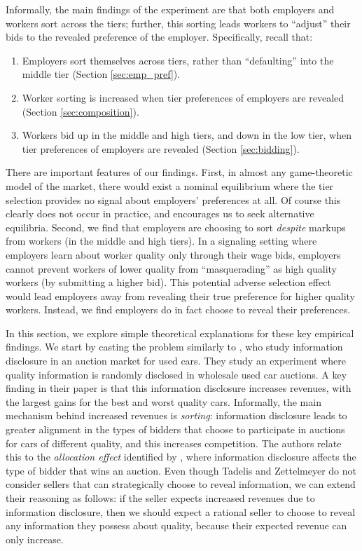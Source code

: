 \documentclass[prodmode,acmec]{ec-acmsmall}
\begin{document}
Informally, the main findings of the experiment are that both employers and workers sort across the tiers;
further, this sorting leads workers to ``adjust'' their bids to the revealed preference of the employer. 
Specifically, recall that:
\begin{enumerate}
\item Employers sort themselves across tiers, rather than ``defaulting'' into the middle tier (Section \ref{sec:emp_pref}).
\item Worker sorting is increased when tier preferences of employers are revealed (Section \ref{sec:composition}).
\item Workers bid up in the middle and high tiers, and down in the low tier, when tier preferences of employers are revealed (Section \ref{sec:bidding}).
\end{enumerate}
There are important features of our findings.
First, in almost any game-theoretic model of the market, there would exist a nominal equilibrium where the tier selection provides no signal about employers' preferences at all.
Of course this clearly does not occur in practice, and encourages us to seek alternative equilibria.
Second, we find that employers are choosing to sort {\em despite} markups from workers (in the middle and high tiers).
In a signaling setting where employers learn about worker quality only through their wage bids, employers cannot prevent workers of lower quality from ``masquerading'' as high quality workers (by submitting a higher bid).
This potential adverse selection effect would lead employers away from revealing their true preference for higher quality workers.
Instead, we find employers do in fact choose to reveal their preferences.

In this section, we explore simple theoretical explanations for these key empirical findings.
We start by casting the problem similarly to \cite{tadelis2011information}, who study information disclosure in an auction market for used cars.  
They study an experiment where quality information  is randomly disclosed in wholesale used car auctions.
A key finding in their paper is that this information disclosure increases revenues, with the largest gains for the best and worst quality cars.
Informally, the main mechanism behind increased revenues is {\em sorting}: information disclosure leads to greater alignment in the types of bidders that choose to participate in auctions for cars of different quality, and this increases competition.
The authors relate this to the {\em allocation effect} identified by \cite{board2009}, where information disclosure affects the type of bidder that wins an auction.  
Even though Tadelis and Zettelmeyer do not consider sellers that can strategically choose to reveal information, we can extend their reasoning as follows:
if the seller expects increased revenues due to information disclosure, then we should expect a rational seller to choose to reveal any information they possess about quality, because their expected revenue can only increase.
\end{document}
